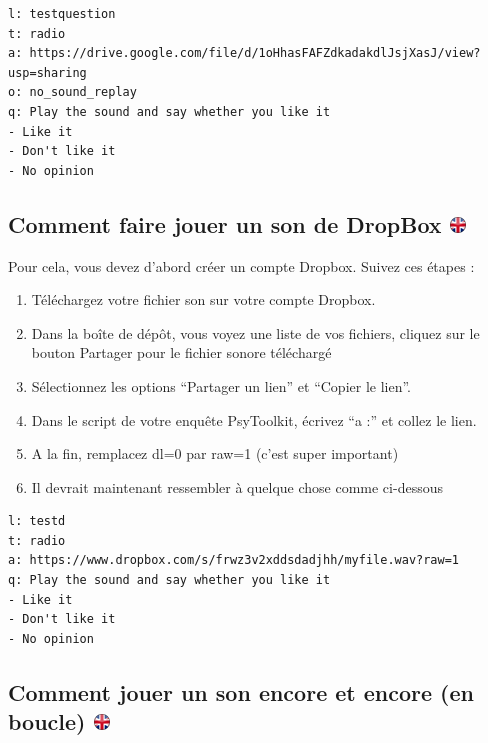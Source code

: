 \documentclass[
]{book}
\providecommand{\tightlist}{%
  \setlength{\itemsep}{0pt}\setlength{\parskip}{0pt}}
\begin{document}
\begin{verbatim}
l: testquestion
t: radio
a: https://drive.google.com/file/d/1oHhasFAFZdkadakdlJsjXasJ/view?usp=sharing
o: no_sound_replay
q: Play the sound and say whether you like it
- Like it
- Don't like it
- No opinion
\end{verbatim}

\hypertarget{comment-faire-jouer-un-son-de-dropbox}{%
\subsection[Comment faire jouer un son de DropBox ]{\texorpdfstring{Comment faire jouer un son de DropBox \href{https://www.psytoolkit.org/lessons/surveyaudiovideo.html\#_how_to_play_a_sound_from_dropbox}{\protect\includegraphics{img/ukflag.png}}}{Comment faire jouer un son de DropBox }}\label{comment-faire-jouer-un-son-de-dropbox}}

Pour cela, vous devez d'abord créer un compte Dropbox. Suivez ces étapes :

\begin{enumerate}
\def\labelenumi{\arabic{enumi}.}
\tightlist
\item
  Téléchargez votre fichier son sur votre compte Dropbox.
\item
  Dans la boîte de dépôt, vous voyez une liste de vos fichiers, cliquez sur le bouton Partager pour le fichier sonore téléchargé
\item
  Sélectionnez les options ``Partager un lien'' et ``Copier le lien''.
\item
  Dans le script de votre enquête PsyToolkit, écrivez ``a :'' et collez le lien.
\item
  A la fin, remplacez dl=0 par raw=1 (c'est super important)
\item
  Il devrait maintenant ressembler à quelque chose comme ci-dessous
\end{enumerate}

\begin{verbatim}
l: testd
t: radio
a: https://www.dropbox.com/s/frwz3v2xddsdadjhh/myfile.wav?raw=1
q: Play the sound and say whether you like it
- Like it
- Don't like it
- No opinion
\end{verbatim}

\hypertarget{comment-jouer-un-son-encore-et-encore-en-boucle}{%
\subsection[Comment jouer un son encore et encore (en boucle) ]{\texorpdfstring{Comment jouer un son encore et encore (en boucle) \href{https://www.psytoolkit.org/lessons/surveyaudiovideo.html\#_how_to_play_a_sound_again_and_again_loop}{\protect\includegraphics{img/ukflag.png}}}{Comment jouer un son encore et encore (en boucle) }}\label{comment-jouer-un-son-encore-et-encore-en-boucle}}
\end{document}
